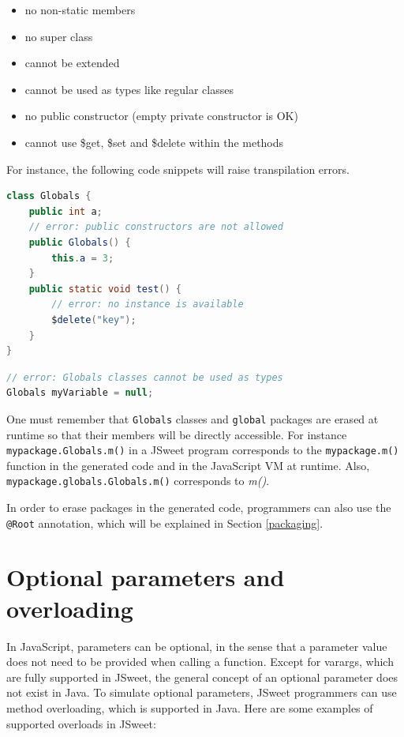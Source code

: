 \documentclass[a4paper]{report}
\begin{document}
\begin{itemize}
\item no non-static members
\item no super class
\item cannot be extended
\item cannot be used as types like regular classes
\item no public constructor (empty private constructor is OK)
\item cannot use \$get, \$set and \$delete within the methods
\end{itemize}

For instance, the following code snippets will raise transpilation errors.

\begin{lstlisting}[language=Java]
class Globals {
	public int a;
	// error: public constructors are not allowed
	public Globals() {
		this.a = 3;
	}
	public static void test() {
		// error: no instance is available
		$delete("key");
	}
}
\end{lstlisting}

\begin{lstlisting}[language=Java]
// error: Globals classes cannot be used as types
Globals myVariable = null;
\end{lstlisting}

One must remember that \texttt{Globals} classes and \texttt{global} packages are erased at runtime so that their members will be directly accessible. For instance \texttt{mypackage.Globals.m()} in a JSweet program corresponds to the \texttt{mypackage.m()} function in the generated code and in the JavaScript VM at runtime. Also, \texttt{mypackage.globals.Globals.m()} corresponds to \emph{m()}.

In order to erase packages in the generated code, programmers can also use the \texttt{@Root} annotation, which will be explained in Section \ref{packaging}.

\section{Optional parameters and overloading} 
\label{optional-parameters-and-overloading}

In JavaScript, parameters can be optional, in the sense that a parameter value does not need to be provided when calling a function. Except for varargs, which are fully supported in JSweet, the general concept of an optional parameter does not exist in Java. To simulate optional parameters, JSweet programmers can use method overloading, which is supported in Java. Here are some examples of supported overloads in JSweet:
\end{document}
